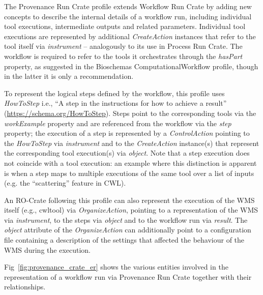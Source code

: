 \documentclass[10pt,letterpaper]{article}
\begin{document}
The Provenance Run Crate profile \cite{WRROC 2023c} extends Workflow Run Crate by adding new concepts to describe the internal details of a workflow run, including individual tool executions, intermediate outputs and related parameters.
Individual tool executions are represented by additional \emph{CreateAction} instances that refer to the tool itself via \emph{instrument} -- analogously to its use in Process Run Crate.
The workflow is required to refer to the tools it orchestrates through the \emph{hasPart} property, as suggested in the Bioschemas ComputationalWorkflow profile, though in the latter it is only a recommendation.

To represent the logical steps defined by the workflow, this profile uses \emph{HowToStep} i.e., “A step in the instructions for how to achieve a result” (\url{https://schema.org/HowToStep}).
Steps point to the corresponding tools via the \emph{workExample} property and are referenced from the workflow via the \emph{step} property; the execution of a step is represented by a \emph{ControlAction} pointing to the
\emph{HowToStep} via \emph{instrument} and to the \emph{CreateAction}
instance(s) that represent the corresponding tool execution(s) via
\emph{object}.
Note that a step execution does not coincide with a tool execution: an example where this distinction is apparent is when a step maps to multiple executions of the same tool over a list of inputs (e.g. the ``scattering'' feature in CWL).

An RO-Crate following this profile can also represent the execution of the WMS itself (e.g., cwltool) via
\emph{OrganizeAction}, pointing to a representation of the WMS via
\emph{instrument}, to the steps via \emph{object} and to the workflow run via \emph{result}.
The \emph{object} attribute of the
\emph{OrganizeAction} can additionally point to a configuration file containing a description of the settings that affected the behaviour of the WMS during the execution.

Fig~\ref{fig:provenance_crate_er} shows the various entities involved in the representation of a workflow run via Provenance Run Crate together with their relationships.
\end{document}
